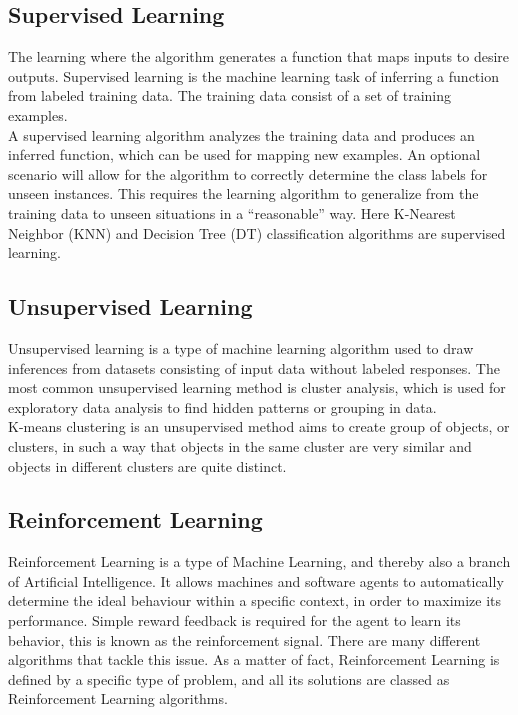 \documentclass[document.tex]{subfiles}
\begin{document}
\subsection{Supervised Learning}
The learning where the algorithm generates a function that maps inputs to desire outputs. Supervised learning is the machine learning task of inferring a function from labeled training data. The training data consist of a set of training examples.\\
A supervised learning algorithm analyzes the training data and produces an inferred function, which can be used for mapping new examples. An optional scenario will allow for the algorithm to correctly determine the class labels for unseen instances. This requires the learning algorithm to generalize from the training data to unseen situations in a “reasonable” way. Here K-Nearest Neighbor (KNN) and Decision Tree (DT) classification algorithms are supervised learning.
\subsection{Unsupervised Learning}
Unsupervised learning is a type of machine learning algorithm used to draw inferences from datasets consisting of input data without labeled responses. The most common unsupervised learning method is cluster analysis, which is used for exploratory data analysis to find hidden patterns or grouping in data.\\
K-means clustering is an unsupervised method aims to create group of objects, or clusters, in such a way that objects in the same cluster are very similar and objects in different clusters are quite distinct.

\subsection{Reinforcement Learning}
Reinforcement Learning is a type of Machine Learning, and thereby also a branch of Artificial Intelligence. It allows machines and software agents to automatically determine the ideal behaviour within a specific context, in order to maximize its performance. Simple reward feedback is required for the agent to learn its behavior, this is known as the reinforcement signal. There are many different algorithms that tackle this issue. As a matter of fact, Reinforcement Learning is defined by a specific type of problem, and all its solutions are classed as Reinforcement Learning algorithms. 
\end{document}
